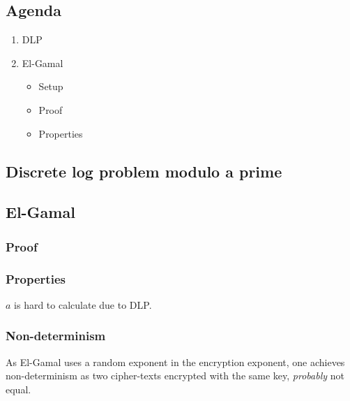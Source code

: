 

\subsection*{Agenda}
\begin{enumerate}
\item DLP
\item El-Gamal
  \begin{itemize}
  \item Setup
  \item Proof
  \item Properties
  \end{itemize}
\end{enumerate}

\subsection{Discrete log problem modulo a prime}


\subsection{El-Gamal}


\subsubsection{Proof}


\subsubsection{Properties}

$a$ is hard to calculate due to DLP.

\subsubsection*{Non-determinism}
As El-Gamal uses a random exponent in the encryption exponent, one
achieves non-determinism as two cipher-texts encrypted with the same
key, \emph{probably} not equal.

